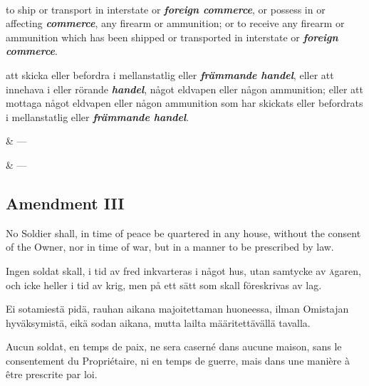 \documentclass[a4,landscape,12pt]{article}
\begin{document}
~

\begin{minipage}[t]{0.22\textwidth}
to ship or transport in interstate or \textbf{\textit{foreign commerce}}, or possess in or affecting \textbf{\textit{commerce}}, any firearm or ammunition; or to receive any firearm or ammunition which has been shipped or transported in interstate or \textbf{\textit{foreign commerce}}.
\end{minipage}\textwidth
\begin{minipage}[t]{0.22\textwidth}
att skicka eller befordra i mellanstatlig eller \textbf{\textit{främmande handel}}, eller att innehava i eller rörande \textbf{\textit{handel}}, något eldvapen eller någon ammunition; eller att mottaga något eldvapen eller någon ammunition som har skickats eller befordrats i mellanstatlig eller \textbf{\textit{främmande handel}}.
\end{minipage}\textwidth
\begin{minipage}[t]{0.22\textwidth}
\& ---
\end{minipage}\textwidth
\begin{minipage}[t]{0.22\textwidth}
\& ---
\end{minipage}

\subsection*{Amendment III}
\begin{minipage}[t]{0.22\textwidth}
No Soldier shall, in time of peace be quartered in any house, without the consent of the Owner, nor in time of war, but in a manner to be prescribed by law.
\end{minipage}\textwidth
\begin{minipage}[t]{0.22\textwidth}
Ingen soldat skall, i tid av fred inkvarteras i något hus, utan samtycke av \textsc{ä}garen, och icke heller i tid av krig, men på ett sätt som skall föreskrivas av lag.
\end{minipage}\textwidth
\begin{minipage}[t]{0.22\textwidth}
Ei sotamiestä pidä, rauhan aikana majoitettaman huoneessa, ilman Omistajan hyväksymistä, eikä sodan aikana, mutta lailta määritettävällä tavalla.
\end{minipage}\textwidth
\begin{minipage}[t]{0.22\textwidth}
Aucun soldat, en temps de paix, ne sera caserné dans aucune maison, sans le consentement du Propriétaire, ni en temps de guerre, mais dans une manière à être prescrite par loi.
\end{minipage}
\end{document}
